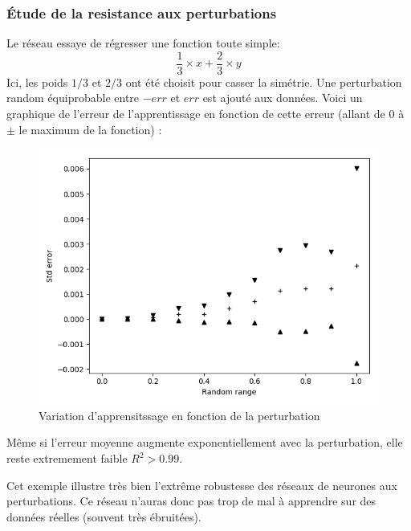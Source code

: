 \subsubsection{Étude de la resistance aux perturbations}\label{subsubsec:random}
Le réseau essaye de régresser une fonction toute simple:
\begin{equation}
    \frac{1}{3} \times x + \frac{2}{3} \times y
\end{equation}
Ici, les poids $1/3$ et $2/3$ ont été choisit pour casser la simétrie.
Une perturbation random équiprobable entre $-err$ et $err$ est ajouté aux données.
Voici un graphique de l'erreur de l'apprentissage en fonction de cette erreur
(allant de $0$ à $\pm$ le maximum de la fonction) :
\begin{figure}[H]
    \center
    \includegraphics[height=\moyen]{pict/random.png}
	\caption{Variation d'apprensitssage en fonction de la perturbation}
	\label{fig:obj2tiers1}
\end{figure}

Même si l'erreur moyenne augmente exponentiellement avec la perturbation,
elle reste extremement faible $R^2 > 0.99$.

Cet exemple illustre très bien l'extrême robustesse des réseaux de neurones aux perturbations.
Ce réseau n'auras donc pas trop de mal à apprendre sur des données réelles (souvent très ébruitées).


